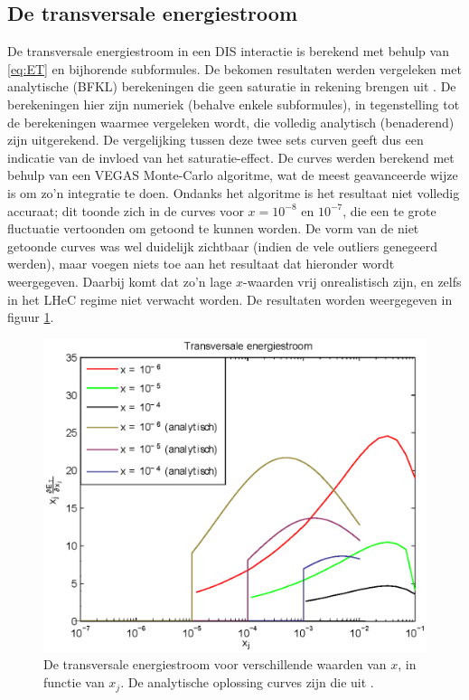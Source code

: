 \documentclass[a4paper,11pt]{article}
\numberwithin{equation}{section} %
\begin{document}
  \subsection{De transversale energiestroom} \label{sec:ResET}
De transversale energiestroom in een DIS interactie is berekend met behulp van \eqref{eq:ET} en bijhorende subformules.
De bekomen resultaten werden vergeleken met analytische (BFKL) berekeningen die geen saturatie in rekening brengen uit \cite{ET}.
De berekeningen hier zijn numeriek (behalve enkele subformules), in tegenstelling tot de berekeningen waarmee vergeleken wordt, die volledig analytisch (benaderend) zijn uitgerekend.
De vergelijking tussen deze twee sets curven geeft dus een indicatie van de invloed van het saturatie-effect.
De curves werden berekend met behulp van een VEGAS Monte-Carlo algoritme, wat de meest geavanceerde wijze is om zo’n integratie te doen.
Ondanks het algoritme is het resultaat niet volledig accuraat; dit toonde zich in de curves voor $x=10^{-8}$ en $10^{-7}$, die een te grote fluctuatie vertoonden om getoond te kunnen worden.
De vorm van de niet getoonde curves was wel duidelijk zichtbaar (indien de vele outliers genegeerd werden), maar voegen niets toe aan het resultaat dat hieronder wordt weergegeven.
Daarbij komt dat zo’n lage $x$-waarden vrij onrealistisch zijn, en zelfs in het LHeC regime niet verwacht worden.
De resultaten worden weergegeven in figuur \ref{fig:ResET}.
\begin{figure} [H]
  \begin{center}
    \includegraphics[width=.66\textwidth]{Afbeeldingen/ET.eps}
    \caption{De transversale energiestroom voor verschillende waarden van $x$, in functie van $x_j$. De analytische oplossing curves zijn die uit \cite[sec. IV]{ET}. }
   \label{fig:ResET}
  \end{center}
\end{figure}
\end{document}
